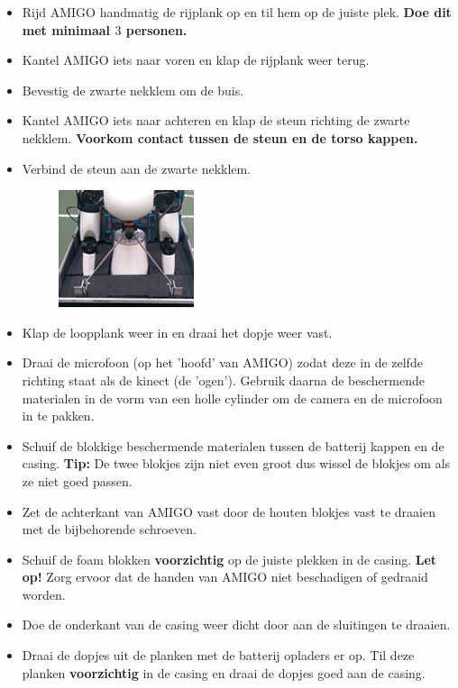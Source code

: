 \documentclass[a4paper,10pt]{article}
\numberwithin{equation}{section}
\numberwithin{figure}{section}
\numberwithin{table}{section}
\begin{document}
\begin{itemize}
\begin{itemize}
		\item Rijd AMIGO handmatig de rijplank op en til hem op de juiste plek. \textbf{Doe dit met minimaal $3$ personen.}
        \item Kantel AMIGO iets naar voren en klap de rijplank weer terug.
        \item Bevestig de zwarte nekklem om de buis.
        \item Kantel AMIGO iets naar achteren en klap de steun richting de zwarte nekklem. \textbf{Voorkom contact tussen de steun en de torso kappen.}
		\item Verbind de steun aan de zwarte nekklem.
		\begin{figure}[H]
			\centering
			\includegraphics[scale = 0.8]{Figures/klem}
		\end{figure}
		\item Klap de loopplank weer in en draai het dopje weer vast.
		\item Draai de microfoon (op het 'hoofd' van AMIGO) zodat deze in de zelfde richting staat als de kinect (de 'ogen'). Gebruik daarna de beschermende materialen in de vorm van een holle cylinder om de camera en de microfoon in te pakken.
		\item Schuif de blokkige beschermende materialen tussen de batterij kappen en de casing. \textbf{Tip:} De twee blokjes zijn niet even groot dus wissel de blokjes om als ze niet goed passen.
		\item Zet de achterkant van AMIGO vast door de houten blokjes vast te draaien met de bijbehorende schroeven.
		\item Schuif de foam blokken \textbf{voorzichtig} op de juiste plekken in de casing. \textbf{Let op!} Zorg ervoor dat de handen van AMIGO niet beschadigen of gedraaid worden.
		\item Doe de onderkant van de casing weer dicht door aan de sluitingen te draaien.
		\item Draai de dopjes uit de planken met de batterij opladers er op.
		Til deze planken \textbf{voorzichtig} in de casing en draai de dopjes goed aan de casing.


\end{itemize}
\end{itemize}
\end{document}
